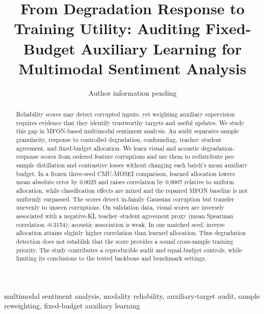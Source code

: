 \documentclass[journal]{IEEEtran}
\title{From Degradation Response to Training Utility: Auditing
Fixed-Budget Auxiliary Learning for Multimodal Sentiment Analysis}
\author{Author information pending}
\begin{document}
\maketitle

\begin{abstract}
Reliability scores may detect corrupted inputs, yet weighting auxiliary
supervision requires evidence that they identify trustworthy targets and
useful updates. We study
this gap in MFON-based multimodal sentiment analysis. An audit separates sample
granularity, response to controlled degradation, confounding, teacher--student agreement,
and fixed-budget allocation. We learn visual and acoustic degradation-response
scores from ordered feature corruptions and use them to redistribute per-sample
distillation and contrastive losses without changing each batch's mean
auxiliary budget. In a frozen three-seed CMU-MOSEI comparison, learned
allocation lowers mean absolute error by 0.0025 and raises correlation by
0.0007 relative to uniform allocation, while classification effects are mixed
and the repaired MFON baseline is not uniformly surpassed. The scores detect
in-family Gaussian corruption but transfer unevenly to unseen corruptions.
On validation data, visual scores are inversely associated with a negative-KL
teacher--student agreement proxy (mean Spearman correlation -0.3154); acoustic association is weak. In
one matched seed, inverse allocation attains slightly higher correlation than
learned allocation. Thus degradation detection does not establish that the
score provides a sound cross-sample training priority. The study contributes a
reproducible audit and equal-budget controls, while limiting its conclusions
to the tested backbone and benchmark settings.
\end{abstract}

\begin{IEEEkeywords}
multimodal sentiment analysis, modality reliability, auxiliary-target audit,
sample reweighting, fixed-budget auxiliary learning
\end{IEEEkeywords}






\end{document}
